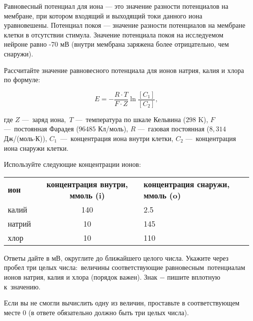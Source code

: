 
Равновесный потенциал для иона — это значение разности потенциалов на мембране, при котором входящий и выходящий токи данного иона уравновешены. Потенциал покоя — значение разности потенциалов на мембране клетки в отсутствии стимула. Значение потенциала покоя на исследуемом нейроне равно -70 мВ (внутри мембрана заряжена более отрицательно, чем снаружи).

Рассчитайте значение равновесного потенциала для ионов натрия, калия и хлора по формуле:

$$E = -\dfrac{R\cdot T}{F\cdot Z}\ln \dfrac{[C_1]}{[C_2]},$$

где $Z$ — заряд иона, $T$ — температура по шкале Кельвина ($298$ K), $F$ — постоянная Фарадея ($96485$ Кл/моль), $R$ — газовая постоянная ($8,314$ Дж/(моль$\cdot$К)), $C_1$~— концентрация иона внутри клетки, $C_2$ — концентрация иона снаружи клетки.

Используйте следующие концентрации ионов:

\begin{tabular}{|l|c|p{5cm}|}
    \bf ион & \bf концентрация внутри, ммоль (i) & \bf концентрация снаружи, ммоль (o) \\
    калий & 140 & 2.5 \\
    натрий & 10 & 145 \\
    хлор & 10 & 110 \\
\end{tabular}

Ответы дайте в мВ, округлите до ближайшего целого числа. Укажите через пробел три целых числа: величины соответствующие равновесным потенциалам ионов натрия, калия и хлора (порядок важен). Знак $-$ пишите вплотную к значению.

Если вы не смогли вычислить одну из величин, проставьте в соответствующем месте 0 (в ответе обязательно должно быть три целых числа). 


